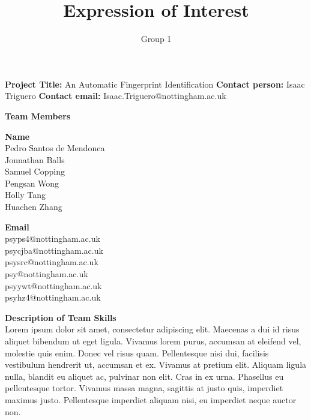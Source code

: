 \documentclass[11pt, oneside]{article}
\title{Expression of Interest}
\author{Group 1}
\begin{document}
\maketitle
\textbf{Project Title: }An Automatic Fingerprint Identification\newline
\textbf{Contact person: }Isaac Triguero\newline
\textbf{Contact email: }Isaac.Triguero@nottingham.ac.uk\newline
    
\vspace{0.3cm}
\textbf{Team Members}\newline
\begin{minipage}[t]{0.5\textwidth}
    \textbf{Name}\\
    Pedro Santos de Mendonca\\
    Jonnathan Balls\\
    Samuel Copping\\
    Pengsan Wong\\
    Holly Tang\\
    Huachen Zhang\\
\end{minipage}
\begin{minipage}[t]{0.5\textwidth}
    \textbf{Email}\\
    psyps4@nottingham.ac.uk \\
    psycjba@nottingham.ac.uk \\
    psysrc@nottingham.ac.uk \\
    psy@nottingham.ac.uk \\
    psyywt@nottingham.ac.uk \\
    psyhz4@nottingham.ac.uk \\
\end{minipage}
\textbf{Description of Team Skills}\\
Lorem ipsum dolor sit amet, consectetur adipiscing elit. Maecenas a dui id risus aliquet bibendum ut eget ligula. Vivamus lorem purus, accumsan at eleifend vel, molestie quis enim. Donec vel risus quam. Pellentesque nisi dui, facilisis vestibulum hendrerit ut, accumsan et ex. Vivamus at pretium elit. Aliquam ligula nulla, blandit eu aliquet ac, pulvinar non elit. Cras in ex urna. Phasellus eu pellentesque tortor. Vivamus massa magna, sagittis at justo quis, imperdiet maximus justo. Pellentesque imperdiet aliquam nisi, eu imperdiet neque auctor non. \\ \newline
\end{document}
